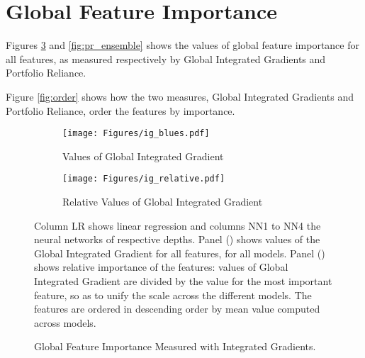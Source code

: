 		
		
		
\section{Global Feature Importance}
	\label{chap:global_feature_importance}
	
	Figures \ref{fig:ig_ensemble} and \ref{fig:pr_ensemble} shows the values of global feature importance for all features, as measured respectively by Global Integrated Gradients and Portfolio Reliance.  
	
	Figure \ref{fig:order} shows how the two measures, Global Integrated Gradients and Portfolio Reliance, order the features by importance. 
	
	\begin{figure}	
		\centering		
		\begin{subfigure}[t]{\textwidth}
			\texttt{[image: Figures/ig\_blues.pdf]}
			\caption{Values of Global Integrated Gradient}
			\label{fig:ig_blues}
		\end{subfigure}
		
		\begin{subfigure}[t]{\textwidth}
			\centering
			\texttt{[image: Figures/ig\_relative.pdf]}
			\caption{Relative Values of Global Integrated Gradient}
			\label{fig:ig_relative}
		\end{subfigure}
		\caption{Global Feature Importance Measured with Integrated Gradients.}
		\medskip
		\small
		Column LR shows linear regression and columns NN1 to NN4 the neural networks of respective depths. Panel () shows values of the Global Integrated Gradient for all features, for all models.  Panel () shows relative importance of the features: values of Global Integrated Gradient are divided by the value for the most important feature, so as to unify the scale across the different models. The features are ordered in descending order by mean value computed across models.
		\label{fig:ig_ensemble}
	\end{figure}
	
